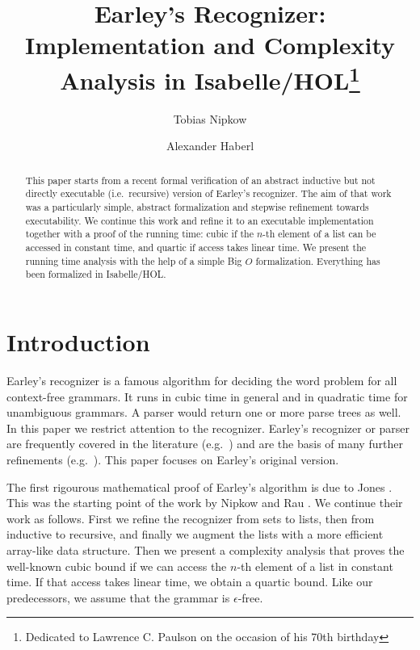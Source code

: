 \documentclass[runningheads]{llncs}
\begin{document}
\title{Earley's Recognizer: Implementation and Complexity Analysis in Isabelle/HOL\thanks{Dedicated to Lawrence C. Paulson on the occasion of his 70th birthday}}

\author{Tobias Nipkow \and
Alexander Haberl}
%


\maketitle

\begin{abstract}
This paper starts from a recent formal verification
of an abstract inductive but not directly executable (i.e.\ recursive) version of Earley's recognizer.
The aim of that work was a particularly simple, abstract formalization and stepwise refinement
towards executability. We continue this work and refine it to an executable
implementation together with a proof of the running time: cubic if the $n$-th element of
a list can be accessed in constant time, and quartic if access takes linear time.
We present the running time analysis with the help of a simple Big $O$ formalization.
Everything has been formalized in Isabelle/HOL.
\end{abstract}

\section{Introduction}

Earley's recognizer \cite{Earley-PhD,Earley-CACM} is a famous algorithm for deciding the word problem
for all context-free grammars. It runs in cubic time in general and in quadratic time for unambiguous grammars.
A parser would return one or more parse trees as well.
In this paper we restrict attention to the recognizer.
Earley's recognizer or parser are frequently covered in the literature (e.g.\ \cite{AhoU72})
and are the basis of many further refinements (e.g.\ \cite{Scott-ENTCS08}).
This paper focuses on Earley's original version.

The first rigourous mathematical proof of Earley's algorithm is due to Jones \cite{Jones,Jones:tr}.
This was the starting point of the work by Nipkow and Rau \cite{NipkowR-CBJ24}.
We continue their work as follows.
First we refine the recognizer from sets to lists, then from inductive to recursive, and finally
we augment the lists with a more efficient array-like data structure.
Then we present a complexity analysis that proves the well-known cubic bound
if we can access the $n$-th element of a list in constant time.
If that access takes linear time, we obtain a quartic bound.
Like our predecessors, we assume that the grammar is $\epsilon$-free.
\end{document}
